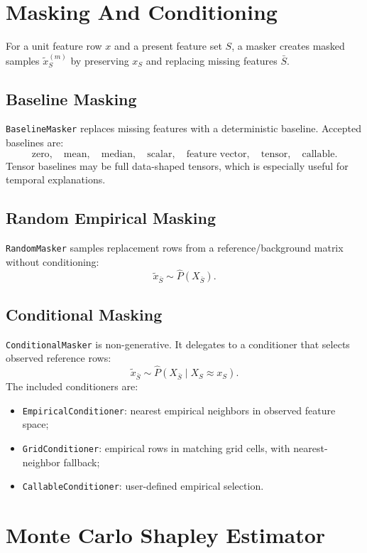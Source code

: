 \documentclass[11pt]{article}
\newcommand{\code}[1]{\texttt{#1}}
\begin{document}
\section{Masking And Conditioning}

For a unit feature row \(x\) and a present feature set \(S\), a masker creates
masked samples \(\tilde{x}^{(m)}_S\) by preserving \(x_S\) and replacing missing
features \(\bar{S}\).

\subsection{Baseline Masking}

\code{BaselineMasker} replaces missing features with a deterministic baseline.
Accepted baselines are:
\[
\text{zero},\quad \text{mean},\quad \text{median},\quad
\text{scalar},\quad \text{feature vector},\quad
\text{tensor},\quad \text{callable}.
\]
Tensor baselines may be full data-shaped tensors, which is especially useful
for temporal explanations.

\subsection{Random Empirical Masking}

\code{RandomMasker} samples replacement rows from a reference/background matrix
without conditioning:
\[
\tilde{x}_{\bar{S}} \sim \widehat{P}(X_{\bar{S}}).
\]

\subsection{Conditional Masking}

\code{ConditionalMasker} is non-generative.  It delegates to a conditioner that
selects observed reference rows:
\[
\tilde{x}_{\bar{S}} \sim \widehat{P}(X_{\bar{S}} \mid X_S \approx x_S).
\]
The included conditioners are:
\begin{itemize}
  \item \code{EmpiricalConditioner}: nearest empirical neighbors in observed
        feature space;
  \item \code{GridConditioner}: empirical rows in matching grid cells, with
        nearest-neighbor fallback;
  \item \code{CallableConditioner}: user-defined empirical selection.
\end{itemize}

\section{Monte Carlo Shapley Estimator}
\end{document}
